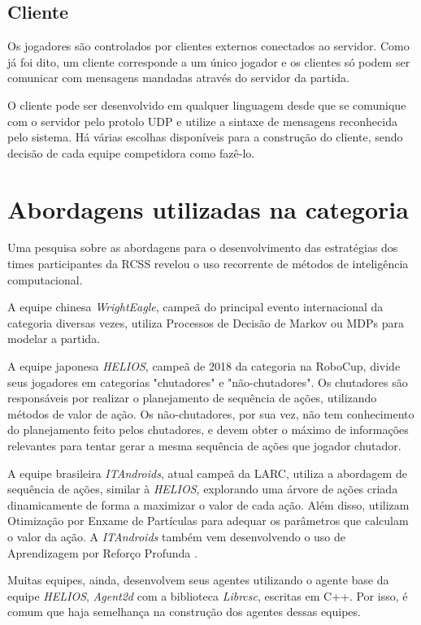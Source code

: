 \subsection{Cliente}
\par Os jogadores são controlados por clientes externos conectados ao servidor. Como já foi dito, um cliente corresponde a um único jogador e os clientes só podem ser comunicar com mensagens mandadas através do servidor da partida.
\par O cliente pode ser desenvolvido em qualquer linguagem desde que se comunique com o servidor pelo protolo UDP e utilize a sintaxe de mensagens reconhecida pelo sistema. Há várias escolhas disponíveis para a construção do cliente, sendo decisão de cada equipe competidora como fazê-lo.

\section{Abordagens utilizadas na categoria}
\par Uma pesquisa sobre as abordagens para o desenvolvimento das estratégias dos times participantes da RCSS revelou o uso recorrente de métodos de inteligência computacional.
\par A equipe chinesa \textit{WrightEagle}, campeã do principal evento internacional da categoria diversas vezes, utiliza Processos de Decisão de Markov ou MDPs para modelar a partida\cite{bai2015online}.
\par A equipe japonesa \textit{HELIOS}, campeã de 2018 da categoria na RoboCup, divide seus jogadores em categorias "chutadores" e "não-chutadores".
Os chutadores são responsáveis por realizar o planejamento de sequência de ações, utilizando métodos de valor de ação.
Os não-chutadores, por sua vez, não tem conhecimento do planejamento feito pelos chutadores, e devem obter o máximo de informações relevantes para tentar gerar a mesma sequência de ações que jogador chutador\cite{nakashima2018helios2018}.
\par A equipe brasileira \textit{ITAndroids}, atual campeã da LARC, utiliza a abordagem de sequência de ações, similar à \textit{HELIOS}, explorando uma árvore de ações criada dinamicamente de forma a maximizar o valor de cada ação. Além disso, utilizam Otimização por Enxame de Partículas \cite{melloitandroids} para adequar os parâmetros que calculam o valor da ação. A \textit{ITAndroids} também vem desenvolvendo o uso de Aprendizagem por Reforço Profunda \cite{maximoitandroids}.
\par Muitas equipes, ainda, desenvolvem seus agentes utilizando o agente base da equipe \textit{HELIOS}, \textit{Agent2d} com a biblioteca \textit{Librcsc}, escritas em C++. Por isso, é comum que haja semelhança na construção dos agentes dessas equipes.
